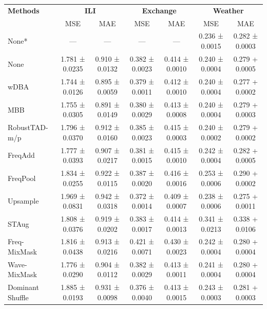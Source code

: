 \begin{table}[h!]
\centering
\vspace{0.2cm}
\renewcommand{\arraystretch}{1.2}
\begin{adjustbox}{max width=\textwidth}
\begin{tabular}{l|cc|cc|cc}
    \toprule
    \textbf{Methods} & \multicolumn{2}{c|}{\textbf{ILI}} & \multicolumn{2}{c|}{\textbf{Exchange}} & \multicolumn{2}{c}{\textbf{Weather}} \\
    & MSE & MAE & MSE & MAE & MSE & MAE \\
    \midrule
                None*         & --- & --- & --- & --- & 0.236 ± 0.0015 & 0.282 ± 0.0003  \\
    None   & 1.781 ± 0.0235 & 0.910 ± 0.0132 & 0.382 ± 0.0023 & 0.414 ± 0.0010 & 0.240 ± 0.0004 & 0.279 + 0.0005 \\
        wDBA          & \cellcolor{secondcolor}1.744 ± 0.0126 & 0.895 ± 0.0059 & 0.379 ± 0.0011 & 0.412 ± 0.0010 & 0.240 ± 0.0004 & 0.277 + 0.0002 \\
        MBB          &  1.755 ± 0.0305 & \cellcolor{secondcolor}0.891 ± 0.0149 & 0.380 ± 0.0029 & 0.413 ± 0.0008 & 0.240 ± 0.0004 & 0.279 + 0.0003 \\
        RobustTAD-m/p   & 1.796 ± 0.0370 & 0.912 ± 0.0160 & 0.385 ± 0.0023 & 0.415 ± 0.0003 & 0.240 ± 0.0002 & 0.279 + 0.0002 \\
        FreqAdd       & 1.777 ± 0.0393 & 0.907 ± 0.0217 & 0.381 ± 0.0015 & 0.415 ± 0.0010 & 0.242 ± 0.0004 & 0.282 + 0.0005 \\
        FreqPool     & 1.834 ± 0.0255 & 0.922 ± 0.0115 & 0.387 ± 0.0020 & 0.416 ± 0.0016 & 0.253 ± 0.0006 & 0.290 + 0.0002 \\
        Upsample      & 1.969 ± 0.0831 & 0.942 ± 0.0318 & \cellcolor{secondcolor}0.372 ± 0.0014 & \cellcolor{secondcolor}0.409 ± 0.0007 & \cellcolor{secondcolor}0.238 ± 0.0006 & \cellcolor{secondcolor}0.275 + 0.0011 \\
        STAug         & 1.808 ± 0.0376 & 0.919 ± 0.0202 & 0.383 ± 0.0017 & 0.414 ± 0.0013 & 0.341 ± 0.0213 & 0.338 + 0.0106 \\
        Freq-MixMask &  1.816 ± 0.0438 & 0.913 ± 0.0216 & 0.421 ± 0.0071 & 0.430 ± 0.0023 & 0.242 ± 0.0004 & 0.280 + 0.0004 \\
        Wave-MixMask  & 1.776 ± 0.0290 & 0.904 ± 0.0112 & 0.382 ± 0.0029 & 0.413 ± 0.0011 & 0.241 ± 0.0004 & 0.280 + 0.0004 \\
        Dominant Shuffle   & 1.885 ± 0.0193 & 0.931 ± 0.0098 & 0.376 ± 0.0040 & 0.413 ± 0.0015 & 0.243 ± 0.0003 & 0.281 + 0.0003 \\

\end{tabular}
\end{adjustbox}
\end{table}
